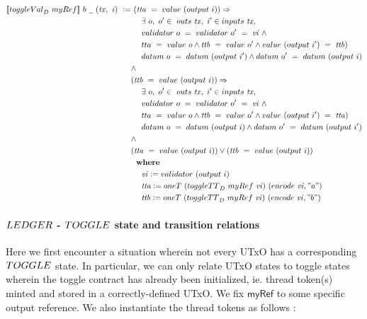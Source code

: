   \begin{align*}
    \applyScript{\toggleVal_D~\mathsf{myRef}}~b~\wcard~(\var{tx},~\var{i})~\leteq &~
    (\var{tta}~ =~ \val~(\fun{output}~i)) \Rightarrow \\
    & ~~~~\exists~o,~o'\in~\outputs~\var{tx},~i' \in \fun{inputs}~\var{tx}, \\
    & ~~~~ \validator~o~=~\validator~o'~=~\var{vi}~\wedge~\\
    & ~~~~ \mathsf{tta}~ =~ \val~o \wedge \var{ttb}~ =~ \val~o' \wedge \val~(\fun{output}~i')~=~\var{ttb}) \\
    & ~~~~ \datum~o~=~\datum~ (\fun{output}~i') \wedge \datum~o'~=~\datum~ (\fun{output}~i) \\
    & \wedge \\
    & (\var{ttb}~ =~ \val~(\fun{output}~i)) \Rightarrow \\
    & ~~~~\exists~o,~o'\in~\outputs~\var{tx},~i' \in \fun{inputs}~\var{tx}, \\
    & ~~~~ \validator~o~=~\validator~o'~=~\var{vi}~\wedge~\\
    & ~~~~ \mathsf{tta}~ =~ \val~o \wedge \var{ttb}~ =~ \val~o' \wedge \val~(\fun{output}~i')~=~\var{tta}) \\
    & ~~~~ \datum~o~=~\datum~ (\fun{output}~i) \wedge \datum~o'~=~\datum~ (\fun{output}~i') \\
    & \wedge \\
    & (\var{tta}~ =~ \val~(\fun{output}~i)) \vee (\var{ttb}~ =~ \val~(\fun{output}~i)) \\
    & \where \\
    & ~~~~\var{vi} \leteq \validator~(\fun{output}~i) \\
    & ~~~~\var{tta} \leteq \mathsf{oneT}~(\toggleTT_D~\mathsf{myRef}~\var{vi})~(\fun{encode}~\var{vi}, "a") \\
    & ~~~~\var{ttb} \leteq \mathsf{oneT}~(\toggleTT_D~\mathsf{myRef}~\var{vi})~(\fun{encode}~\var{vi}, "b")
  \end{align*}

\paragraph{$\LEDGER$ - $\TOGGLE$ state and transition relations}

Here we first encounter a situation wherein not every UTxO has a corresponding
$\TOGGLE$ state. In particular, we can only relate UTxO states to toggle states
wherein the toggle contract has already been initialized, ie. thread token(s) minted
and stored in a correctly-defined UTxO. We fix $\mathsf{myRef}$ to some specific
output reference. We also instantiate the thread tokens as follows :

